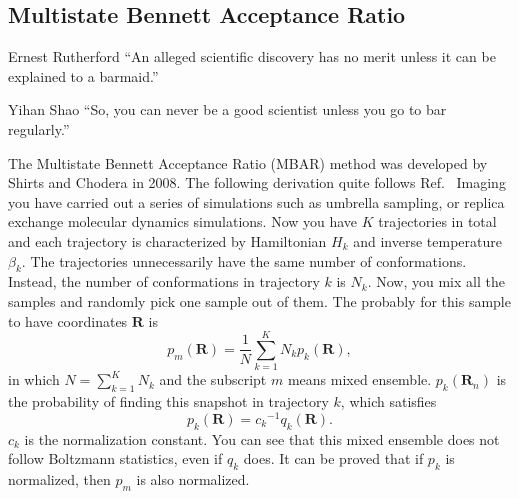 \subsection{Multistate Bennett Acceptance Ratio\label{Sec:FEM:MBAR}}
\begin{chapquote}{Ernest Rutherford%
	}
	``An alleged scientific discovery has no merit unless it can be explained to a barmaid.''
\end{chapquote}
\begin{chapquote}{Yihan Shao
	}
	``So, you can never be a good scientist unless you go to bar regularly.''
\end{chapquote}
The Multistate Bennett Acceptance Ratio (MBAR) method was developed by Shirts and Chodera in 2008.\cite{ShirtsJCP2008} The following derivation quite follows Ref.~\cite{ShirtsarXiv2017}
Imaging you have carried out a series of simulations such as umbrella sampling, or replica exchange molecular dynamics simulations.
Now you have $K$ trajectories in total and each trajectory is characterized by Hamiltonian $H_k$ and inverse temperature $\beta_k$. The trajectories unnecessarily have the same number of conformations. Instead, the number of conformations in trajectory $k$ is $N_k$. Now, you mix all the samples and randomly pick one sample out of them. The probably for this sample to have coordinates $\mathbf{R}$ is 
\begin{equation}
p_m(\mathbf{R})=\frac 1N\sum_{k=1}^{K}N_kp_k(\mathbf{R}),
\end{equation}
in which $N=\sum\limits_{k=1}^{K}N_k$ and the subscript $m$ means mixed ensemble. $p_k(\mathbf{R}_n)$ is the probability of finding this snapshot in trajectory $k$, which satisfies
\begin{equation}
p_k(\mathbf{R})={c_k}^{-1}q_k(\mathbf{R}).
\end{equation}
$c_k$ is the normalization constant. You can see that this mixed ensemble does not follow Boltzmann statistics, even if $q_k$ does. It can be proved that if $p_k$ is normalized, then $p_m$ is also normalized.

